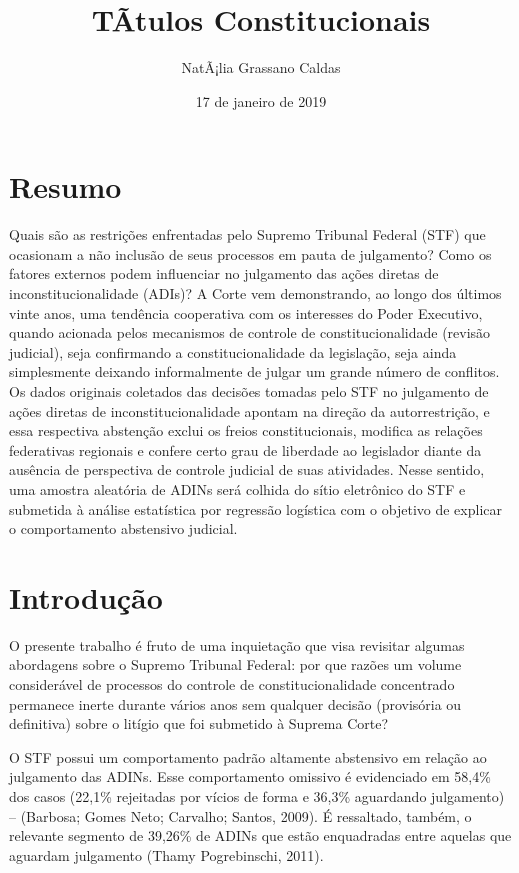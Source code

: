 \documentclass[]{article}
\title{TÃ­tulos Constitucionais}
\author{NatÃ¡lia Grassano Caldas}
\date{17 de janeiro de 2019}
\begin{document}
\maketitle

\section{Resumo}\label{resumo}

Quais são as restrições enfrentadas pelo Supremo Tribunal Federal (STF)
que ocasionam a não inclusão de seus processos em pauta de julgamento?
Como os fatores externos podem influenciar no julgamento das ações
diretas de inconstitucionalidade (ADIs)? A Corte vem demonstrando, ao
longo dos últimos vinte anos, uma tendência cooperativa com os
interesses do Poder Executivo, quando acionada pelos mecanismos de
controle de constitucionalidade (revisão judicial), seja confirmando a
constitucionalidade da legislação, seja ainda simplesmente deixando
informalmente de julgar um grande número de conflitos. Os dados
originais coletados das decisões tomadas pelo STF no julgamento de ações
diretas de inconstitucionalidade apontam na direção da autorrestrição, e
essa respectiva abstenção exclui os freios constitucionais, modifica as
relações federativas regionais e confere certo grau de liberdade ao
legislador diante da ausência de perspectiva de controle judicial de
suas atividades. Nesse sentido, uma amostra aleatória de ADINs será
colhida do sítio eletrônico do STF e submetida à análise estatística por
regressão logística com o objetivo de explicar o comportamento
abstensivo judicial.

\section{Introdução}\label{introducao}

O presente trabalho é fruto de uma inquietação que visa revisitar
algumas abordagens sobre o Supremo Tribunal Federal: por que razões um
volume considerável de processos do controle de constitucionalidade
concentrado permanece inerte durante vários anos sem qualquer decisão
(provisória ou definitiva) sobre o litígio que foi submetido à Suprema
Corte?

O STF possui um comportamento padrão altamente abstensivo em relação ao
julgamento das ADINs. Esse comportamento omissivo é evidenciado em
58,4\% dos casos (22,1\% rejeitadas por vícios de forma e 36,3\%
aguardando julgamento) -- (Barbosa; Gomes Neto; Carvalho; Santos, 2009).
É ressaltado, também, o relevante segmento de 39,26\% de ADINs que estão
enquadradas entre aquelas que aguardam julgamento (Thamy Pogrebinschi,
2011).
\end{document}
